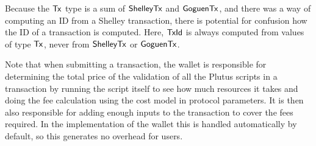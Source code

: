 Because the $\mathsf{Tx}$ type is a sum of $\mathsf{ShelleyTx}$ and $\mathsf{GoguenTx}$, and
there was a way of computing an ID from a Shelley transaction, there
is potential for confusion how the ID of a transaction is
computed. Here, $\mathsf{TxId}$ is always computed from values of type $\mathsf{Tx}$,
never from $\mathsf{ShelleyTx}$ or $\mathsf{GoguenTx}$.

Note that when submitting a transaction, the wallet is responsible for
determining the total price of the
validation of all the Plutus scripts in a transaction
by running the script itself to see how much resources it takes and doing the
fee calculation using the cost model in protocol parameters. It is then
also responsible for adding enough inputs to the transaction to cover the
fees required. In the implementation of the wallet this is handled
automatically by default, so this generates no overhead for users.

